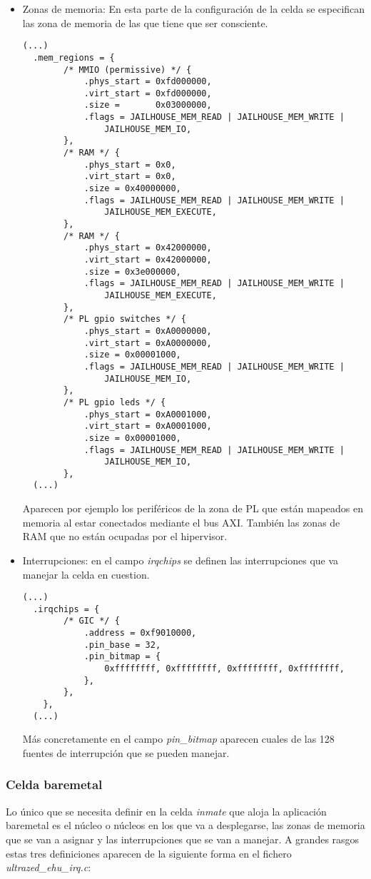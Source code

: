 \begin{itemize}
  \item Zonas de memoria: En esta parte de la configuración de la celda se especifican las zona de memoria de las que tiene que ser consciente.
  \begin{lstlisting}[style=CStyle]
  (...)
  .mem_regions = {
		/* MMIO (permissive) */ {
			.phys_start = 0xfd000000,
			.virt_start = 0xfd000000,
			.size =	      0x03000000,
			.flags = JAILHOUSE_MEM_READ | JAILHOUSE_MEM_WRITE |
				JAILHOUSE_MEM_IO,
		},
		/* RAM */ {
			.phys_start = 0x0,
			.virt_start = 0x0,
			.size = 0x40000000,
			.flags = JAILHOUSE_MEM_READ | JAILHOUSE_MEM_WRITE |
				JAILHOUSE_MEM_EXECUTE,
		},
		/* RAM */ {
			.phys_start = 0x42000000,
			.virt_start = 0x42000000,
			.size = 0x3e000000,
			.flags = JAILHOUSE_MEM_READ | JAILHOUSE_MEM_WRITE |
				JAILHOUSE_MEM_EXECUTE,
		},
		/* PL gpio switches */ {
			.phys_start = 0xA0000000,
			.virt_start = 0xA0000000,
			.size = 0x00001000,
			.flags = JAILHOUSE_MEM_READ | JAILHOUSE_MEM_WRITE |
				JAILHOUSE_MEM_IO,
		},
		/* PL gpio leds */ {
			.phys_start = 0xA0001000,
			.virt_start = 0xA0001000,
			.size = 0x00001000,
			.flags = JAILHOUSE_MEM_READ | JAILHOUSE_MEM_WRITE |
				JAILHOUSE_MEM_IO,
		},
  (...)
  \end{lstlisting}
  Aparecen por ejemplo los periféricos de la zona de \acrshort{PL} que están mapeados en memoria al estar conectados mediante el bus \acrshort{AXI}. También las zonas de \acrshort{RAM} que no están ocupadas por el hipervisor.

  \item Interrupciones: en el campo \textit{irqchips} se definen las interrupciones que va manejar la celda en cuestion.
  \begin{lstlisting}[style=CStyle]
  (...)
  .irqchips = {
		/* GIC */ {
			.address = 0xf9010000,
			.pin_base = 32,
			.pin_bitmap = {
				0xffffffff, 0xffffffff, 0xffffffff, 0xffffffff,
			},
		},
	},
  (...)
  \end{lstlisting}
  Más concretamente en el campo \textit{pin\_bitmap} aparecen cuales de las 128 fuentes de interrupción que se pueden manejar.

\end{itemize}

\subsubsection{Celda baremetal}
Lo único que se necesita definir en la celda \textit{inmate} que aloja la aplicación baremetal es el núcleo o núcleos en los que va a desplegarse, las zonas de memoria que se van a asignar y las interrupciones que se van a manejar. A grandes rasgos estas tres definiciones aparecen de la siguiente forma en el fichero \textit{ultrazed\_ehu\_irq.c}:

